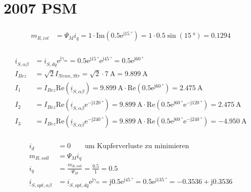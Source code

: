 \documentclass[11pt,a4paper]{scrartcl}
\newcommand{\mybr}[1]{\left(#1\right)}
\renewcommand{\j}{\mathrm{j}}
\renewcommand{\i}{\underline{i}}
\newcommand{\0}{_{\mybr{0}}}
\newcommand{\1}{_{\mybr{1}}}
\newcommand{\2}{_{\mybr{2}}}
\renewcommand{\e}{\mathrm{e}}
\renewcommand{\Re}{\mathrm{Re}}
\renewcommand{\Im}{\mathrm{Im}}
\newcommand{\isab}{\i_{S,\alpha\beta}}
\newcommand{\isdq}{\i_{S,dq}}
\begin{document}
\clearpage
\part{2007 PSM}
\section{}
\begin{align}
	m_{R,ist}&=\Psi_M i_q=1\cdot\Im\mybr{\num{0.5}\e^{\j\SI{15}{\degree}}}=1\cdot\num{0.5}\sin\mybr{\SI{15}{\degree}}=\num{0.1294}
\end{align}
\section{}
\begin{align}
	\isab&=\isdq\e^{\j\gamma_m}=\num{0.5}\e^{\j\SI{15}{\degree}}\e^{\j\SI{45}{\degree}}=\num{0.5}\e^{\j\SI{60}{\degree}}\\
	I_{Bez}&=\sqrt{2}I_{Nenn,Str}=\sqrt{2}\cdot\SI{7}{\ampere}=\SI{9.899}{\ampere}\\
	I_1&=I_{Bez}\Re\mybr{\isab}=\SI{9.899}{\ampere}\cdot\Re\mybr{\num{0.5}\e^{\j\SI{60}{\degree}}}=\SI{2.475}{\ampere}\\
	I_2&=I_{Bez}\Re\mybr{\isab\e^{-\j\SI{120}{\degree}}}=\SI{9.899}{\ampere}\cdot\Re\mybr{\num{0.5}\e^{\j\SI{60}{\degree}}\e^{-\j\SI{120}{\degree}}}=\SI{2.475}{\ampere}\\
	I_3&=I_{Bez}\Re\mybr{\isab\e^{-\j\SI{240}{\degree}}}=\SI{9.899}{\ampere}\cdot\Re\mybr{\num{0.5}\e^{\j\SI{60}{\degree}}\e^{-\j\SI{240}{\degree}}}=\SI{-4.950}{\ampere}
\end{align}

\section{}
\begin{align}
	i_d&=0\quad\quad\text{um Kupferverluste zu minimieren}\\
	m_{R,soll}&=\Psi_M i_q\\
	i_q&=\frac{m_{R,soll}}{\Psi_M}=\frac{\num{0.5}}{1}=\num{0.5}\\
	\i_{S,opt,\alpha\beta}&=\i_{S,opt,dq}\e^{\j\gamma_m}=\j\num{0.5}\e^{\j\SI{45}{\degree}}=\num{0.5}\e^{\j\SI{135}{\degree}}=-\num{0.3536}+\j\num{0.3536}
\end{align}
\end{document}
